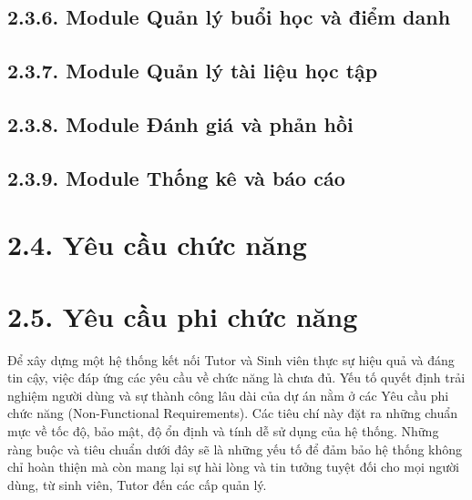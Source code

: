 
\subsection*{2.3.6. Module Quản lý buổi học và điểm danh}


\subsection*{2.3.7. Module Quản lý tài liệu học tập}


\subsection*{2.3.8. Module Đánh giá và phản hồi}


\subsection*{2.3.9. Module Thống kê và báo cáo}


\section*{2.4. Yêu cầu chức năng}



\section*{2.5. Yêu cầu phi chức năng}
Để xây dựng một hệ thống kết nối Tutor và Sinh viên thực sự hiệu quả và đáng tin cậy, việc đáp ứng các yêu cầu về chức năng là chưa đủ. Yếu tố quyết định trải nghiệm người dùng và sự thành công lâu dài của dự án nằm ở các Yêu cầu phi chức năng (Non-Functional Requirements). Các tiêu chí này đặt ra những chuẩn mực về tốc độ, bảo mật, độ ổn định và tính dễ sử dụng của hệ thống. Những ràng buộc và tiêu chuẩn dưới đây sẽ là những yếu tố để đảm bảo hệ thống không chỉ hoàn thiện mà còn mang lại sự hài lòng và tin tưởng tuyệt đối cho mọi người dùng, từ sinh viên, Tutor đến các cấp quản lý.

